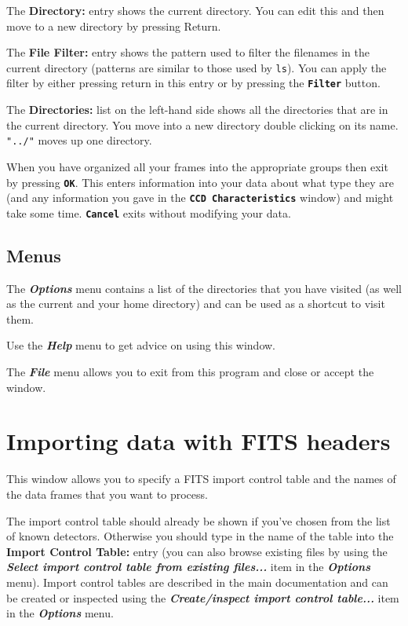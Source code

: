 \documentclass[11pt]{article}
\newcommand{\xref}[3]{#1}
\newcommand{\xlabel}[1]{}
\newcommand{\butt}[1]{{\bf \tt #1}}
\newcommand{\menu}[1]{{\bf \em #1}}
\newcommand{\wlab}[1]{{\bf #1}}
\newcommand{\text}[1]{{\tt #1}}
\begin{document}
The \xlabel{CCDNDFDoImportDirectory}\wlab{Directory:} entry shows the
current directory. You can edit this and then move to a new directory
by pressing Return.

The \xlabel{CCDNDFDoImportFilter}\wlab{File Filter:} entry shows the
pattern used to filter the filenames in the current directory
(patterns are similar to those used by \text{ls}). You can apply the
filter by either pressing return in this entry or by pressing the
\butt{Filter} button.

The \xlabel{CCDNDFDoImportDirectories}\wlab{Directories:} list on the
left-hand side shows all the directories that are in the current
directory. You move into a new directory double clicking on its
name. \text{"../"} moves up one directory.

When \xlabel{CCDNDFDoImportChoice}you have organized all your frames
into the appropriate groups then exit by pressing \butt{OK}. This
enters information into your data about what type they are (and any
information you gave in the \butt{CCD Characteristics} window) and
might take some time. \butt{Cancel} exits without modifying your data.

\subsection{Menus  \xlabel{CCDNDFDoImportMenu}}
The \menu{Options} menu contains a list of the directories that you have
visited (as well as the current and your home directory) and can be
used as a shortcut to visit them.

Use the \menu{Help} menu to get advice on using this window.

The \menu{File} menu allows you to exit from this program and close or
accept the window.

\section{Importing data with FITS headers \xlabel{CCDFITSImportWindow}}
This window allows you to specify a FITS import control table and
the names of the data frames that you want to process.

The import control table should already be shown if you've chosen from the
list of known detectors. Otherwise you should type in the name of the table
into the \wlab{Import Control Table:} entry (you can also browse existing
files by using the \menu{Select import control table from existing files...}
item in the \menu{Options} menu). Import control tables are
\xref{described}{sun139}{TableFormat} in the main documentation and can be
created or inspected using the \menu{Create/inspect import control table...}
item in the \menu{Options} menu.
\end{document}

